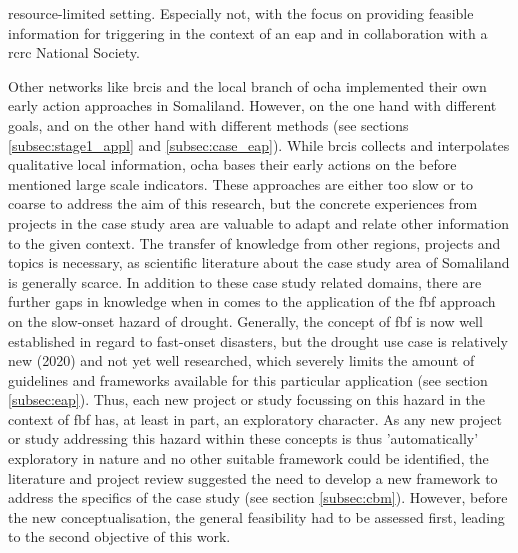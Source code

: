 resource-limited setting. Especially not, with the focus on providing feasible information for triggering  in the context of an \acrshort{eap} and in collaboration with a \acrshort{rcrc} National Society.\newline

Other networks like \acrlong{brcis} and the local branch of \acrshort{ocha} implemented their own early action approaches in Somaliland. However, on the one hand with different goals, and on the other hand with different methods (see sections \ref{subsec:stage1_appl} and \ref{subsec:case_eap}). While \acrshort{brcis} collects and interpolates qualitative local information, \acrshort{ocha} bases their early actions on the before mentioned large scale indicators. These approaches are either too slow or to coarse to address the aim of this research, but the concrete experiences from projects in the case study area are valuable to adapt and relate other information to the given context. The transfer of knowledge from other regions, projects and topics is necessary, as scientific literature about the case study area of Somaliland is generally scarce. In addition to these case study related domains, there are further gaps in knowledge when in comes to the application of the \acrshort{fbf} approach on the slow-onset hazard of drought. Generally, the concept of \acrshort{fbf} is now well established in regard to fast-onset disasters, but the drought use case is relatively new (2020) and not yet well researched, which severely limits the amount of guidelines and frameworks available for this particular application (see section \ref{subsec:eap}). Thus, each new project or study focussing on this hazard in the context of \acrshort{fbf} has, at least in part, an exploratory character.\newline
As any new project or study addressing this hazard within these concepts is thus 'automatically' exploratory in nature and no other suitable framework could be identified, the literature and project review suggested the need to develop a new framework to address the specifics of the case study (see section \ref{subsec:cbm}). However, before the new conceptualisation, the general feasibility had to be assessed first, leading to the second objective of this work.


